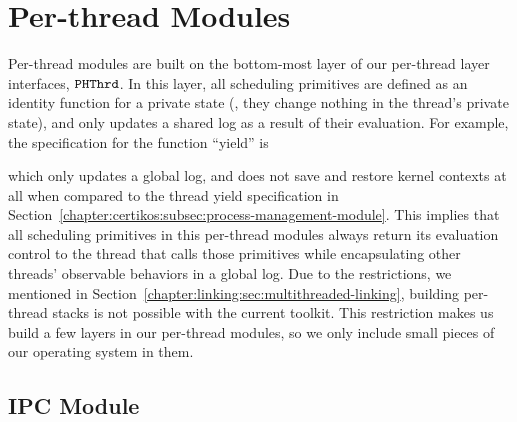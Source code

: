 \section{Per-thread Modules}
\label{chapter:certikos:sec:per-thread-modules}


Per-thread modules are built on
the bottom-most layer of our per-thread  layer interfaces, ${{\mathrm{\texttt{PHThrd}}}}$.
In this layer, all scheduling primitives are defined as an identity function for a private state (\ie, they change nothing in the thread's private state),
and only updates a shared log as a result of their evaluation. 
For example, the specification for the  function ``yield''  is

which only updates a global log, and does not save and restore kernel contexts at all when compared to the thread yield  specification
in Section~\ref{chapter:certikos:subsec:process-management-module}.
This implies that all scheduling primitives in this per-thread modules always return its evaluation control to the thread  that calls those primitives while
encapsulating other threads' observable behaviors in a global log.
Due to the restrictions, we mentioned in Section~\ref{chapter:linking:sec:multithreaded-linking},
building per-thread stacks is not possible with the current toolkit. 
This restriction makes us build a few layers in our per-thread modules,
so we only include small pieces of our operating system in them.



\subsection{IPC Module}
\label{chapter:certikos:subsec:ipc-module}

